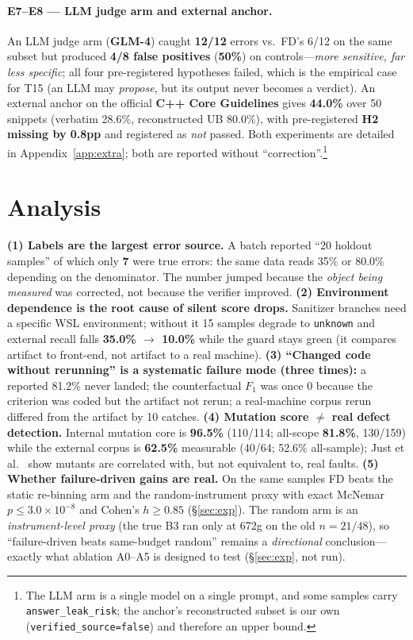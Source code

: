 \documentclass{article}
\begin{document}
\paragraph{E7--E8 --- LLM judge arm and external anchor.}
An LLM judge arm (\textbf{GLM-4}) caught \textbf{12/12} errors vs.\ FD's 6/12 on the same subset
but produced \textbf{4/8 false positives} (\textbf{50\%}) on controls---\emph{more sensitive, far
less specific}; all four pre-registered hypotheses failed, which is the empirical case for T15 (an
LLM may \emph{propose}, but its output never becomes a verdict). An external anchor on the official
\textbf{C++ Core Guidelines} gives \textbf{44.0\%} over 50 snippets (verbatim 28.6\%, reconstructed
UB 80.0\%), with pre-registered \textbf{H2 missing by 0.8pp} and registered as \emph{not} passed.
Both experiments are detailed in Appendix~\ref{app:extra}; both are reported without
``correction''.\footnote{The LLM arm is a single model on a single prompt, and some samples carry
\texttt{answer\_leak\_risk}; the anchor's reconstructed subset is our own (\texttt{verified\_source=false})
and therefore an upper bound.}

\section{Analysis}
\label{sec:analysis}
\textbf{(1) Labels are the largest error source.} A batch reported ``20 holdout samples'' of which
only \textbf{7} were true errors: the same data reads 35\% or 80.0\% depending on the denominator.
The number jumped because the \emph{object being measured} was corrected, not because the verifier
improved. \textbf{(2) Environment dependence is the root cause of silent score drops.} Sanitizer
branches need a specific WSL environment; without it 15 samples degrade to \texttt{unknown} and
external recall falls \textbf{35.0\% $\to$ 10.0\%} while the guard stays green (it compares
artifact to front-end, not artifact to a real machine). \textbf{(3) ``Changed code without
rerunning'' is a systematic failure mode (three times):} a reported 81.2\% never landed; the
counterfactual $F_1$ was once 0 because the criterion was coded but the artifact not rerun; a
real-machine corpus rerun differed from the artifact by 10 catches.
\textbf{(4) Mutation score $\neq$ real defect detection.} Internal mutation core is \textbf{96.5\%}
(110/114; all-scope \textbf{81.8\%}, 130/159) while the external corpus is \textbf{62.5\%}
measurable (40/64; 52.6\% all-sample); Just et
al.~\cite{just2014mutants} show mutants are correlated with, but not equivalent to, real faults.
\textbf{(5) Whether failure-driven gains are real.} On the same samples FD beats the static
re-binning arm and the random-instrument proxy with exact McNemar $p\le3.0\times10^{-8}$ and Cohen's
$h\ge0.85$ (\S\ref{sec:exp}). The random arm is an \emph{instrument-level proxy} (the true B3 ran
only at 672g on the old $n{=}21/48$), so ``failure-driven beats same-budget random'' remains a
\emph{directional} conclusion---exactly what ablation A0--A5 is designed to test (\S\ref{sec:exp},
not run).
\end{document}
